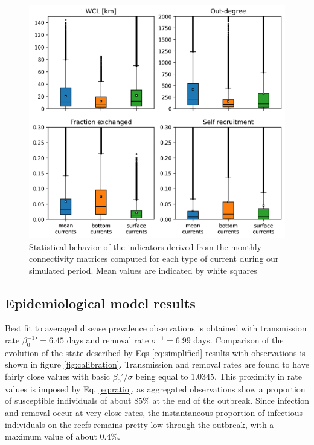 \documentclass[utf8]{frontiersSCNS}
\newcommand{\dobby}[1]{\textbf{\color{violet}{#1}}}
\begin{document}
\begin{figure}
    \centering
    \includegraphics[width=.8\textwidth]{figures/connect_paper.png}
    \caption{Statistical behavior of the indicators derived from the monthly connectivity matrices computed for each type of current during our simulated period. Mean values are indicated by white squares}
    \label{fig:connect}
\end{figure}

\subsection{Epidemiological model results}

Best fit to averaged disease prevalence observations is obtained with transmission rate $\beta_0^{-1}'=6.45$ days and removal rate $\sigma^{-1}=6.99$ days. Comparison of the evolution of the state described by Eqs \ref{eq:simplified} results with observations is shown in figure \ref{fig:calibration}. Transmission and removal rates are found to have fairly close values with basic  $\beta_0'/\sigma$ being equal to $1.0345$. This proximity in rate values is imposed by Eq. \ref{eq:ratio}, as aggregated observations show a proportion of susceptible individuals of about $85\%$ at the end of the outbreak. Since infection and removal occur at very close rates, the instantaneous proportion of infectious individuals on the reefs remains pretty low through the outbreak, with a maximum value of about $0.4\%$.
\dobby{[I might come up with some more ideas when figures merged, as it will ease comparisons]}
\end{document}
